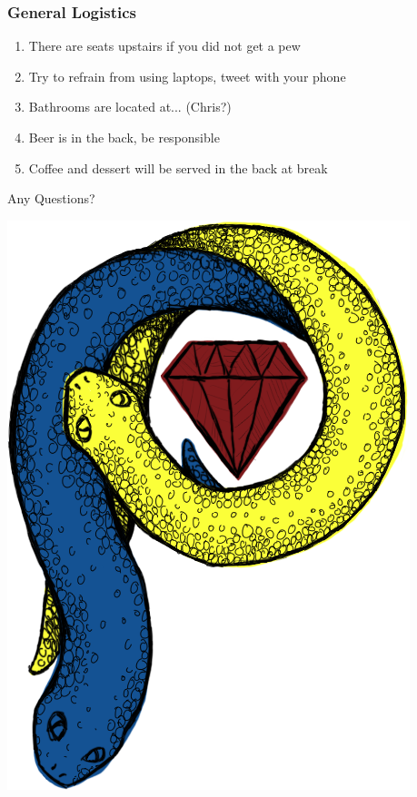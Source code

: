 \documentclass[xcolor=dvipsnames,red]{beamer}
\begin{document}
\begin{frame}
\frametitle{General Logistics}
\begin{enumerate}
\item There are seats upstairs if you did not get a pew
\item Try to refrain from using laptops, tweet with your phone
\item Bathrooms are located at... (Chris?)
\item Beer is in the back, be responsible
\item Coffee and dessert will be served in the back at break
\end{enumerate}

Any Questions?
\end{frame}

\begin{frame}[plain]
\titlepage
\vspace{-2 cm}
\begin{center}
\includegraphics[width=.4\textwidth]{imgs/rs-logo-2.png}
\end{center}
\end{frame}
\end{document}
